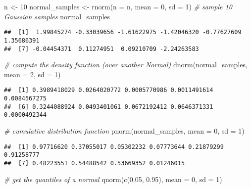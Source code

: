 \documentclass[
  oneside]{book}
\newenvironment{Shaded}{\begin{snugshade}}{\end{snugshade}}
\newcommand{\AttributeTok}[1]{\textcolor[rgb]{0.77,0.63,0.00}{#1}}
\newcommand{\CommentTok}[1]{\textcolor[rgb]{0.56,0.35,0.01}{\textit{#1}}}
\newcommand{\DecValTok}[1]{\textcolor[rgb]{0.00,0.00,0.81}{#1}}
\newcommand{\FloatTok}[1]{\textcolor[rgb]{0.00,0.00,0.81}{#1}}
\newcommand{\FunctionTok}[1]{\textcolor[rgb]{0.00,0.00,0.00}{#1}}
\newcommand{\NormalTok}[1]{#1}
\newcommand{\OtherTok}[1]{\textcolor[rgb]{0.56,0.35,0.01}{#1}}
\begin{document}
\begin{Shaded}
\begin{Highlighting}[]
\NormalTok{n }\OtherTok{\textless{}{-}} \DecValTok{10}
\NormalTok{normal\_samples }\OtherTok{\textless{}{-}} \FunctionTok{rnorm}\NormalTok{(}\AttributeTok{n =}\NormalTok{ n, }\AttributeTok{mean =} \DecValTok{0}\NormalTok{, }\AttributeTok{sd =} \DecValTok{1}\NormalTok{) }\CommentTok{\# sample 10 Gaussian samples}
\NormalTok{normal\_samples}
\end{Highlighting}
\end{Shaded}

\begin{verbatim}
##  [1]  1.99845274 -0.33039656 -1.61622975 -1.42046320 -0.77627609  1.35686391
##  [7] -0.04454371  0.11274951  0.09210709 -2.24263583
\end{verbatim}

\begin{Shaded}
\begin{Highlighting}[]
\CommentTok{\# compute the density function (over another Normal)}
\FunctionTok{dnorm}\NormalTok{(normal\_samples, }\AttributeTok{mean =} \DecValTok{2}\NormalTok{, }\AttributeTok{sd =} \DecValTok{1}\NormalTok{)}
\end{Highlighting}
\end{Shaded}

\begin{verbatim}
##  [1] 0.3989418029 0.0264020772 0.0005770986 0.0011491614 0.0084567275
##  [6] 0.3244088924 0.0493401061 0.0672192412 0.0646371331 0.0000492344
\end{verbatim}

\begin{Shaded}
\begin{Highlighting}[]
\CommentTok{\# cumulative distribution function}
\FunctionTok{pnorm}\NormalTok{(normal\_samples, }\AttributeTok{mean =} \DecValTok{0}\NormalTok{, }\AttributeTok{sd =} \DecValTok{1}\NormalTok{)}
\end{Highlighting}
\end{Shaded}

\begin{verbatim}
##  [1] 0.97716620 0.37055017 0.05302232 0.07773644 0.21879299 0.91258777
##  [7] 0.48223551 0.54488542 0.53669352 0.01246015
\end{verbatim}

\begin{Shaded}
\begin{Highlighting}[]
\CommentTok{\# get the quantiles of a normal}
\FunctionTok{qnorm}\NormalTok{(}\FunctionTok{c}\NormalTok{(}\FloatTok{0.05}\NormalTok{, }\FloatTok{0.95}\NormalTok{), }\AttributeTok{mean =} \DecValTok{0}\NormalTok{, }\AttributeTok{sd =} \DecValTok{1}\NormalTok{)}
\end{Highlighting}
\end{Shaded}
\end{document}
